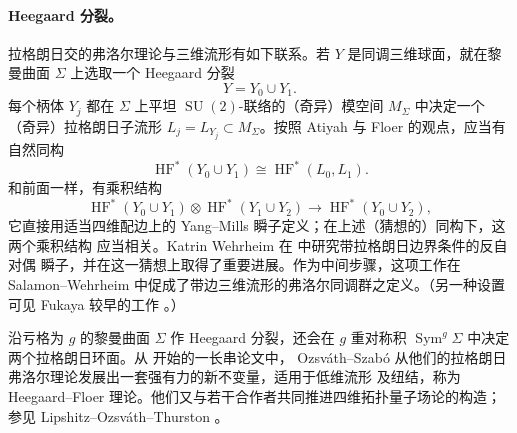 \begin{remark}
\paragraph{Heegaard 分裂。}
拉格朗日交的弗洛尔理论与三维流形有如下联系。若 $Y$ 是同调三维球面，就在黎曼曲面
$\Sigma$ 上选取一个 Heegaard 分裂
\[
  Y=Y_0\cup Y_1.
\]
每个柄体 $Y_j$ 都在 $\Sigma$ 上平坦 $\operatorname{SU}(2)$-联络的（奇异）模空间
$M_\Sigma$ 中决定一个（奇异）拉格朗日子流形
$L_j=L_{Y_j}\subset M_\Sigma$。按照 Atiyah  与 Floer 的观点，应当有自然同构
\[
  \operatorname{HF}^*(Y_0\cup Y_1)
  \cong\operatorname{HF}^*(L_0,L_1).
\]
和前面一样，有乘积结构
\[
  \operatorname{HF}^*(Y_0\cup Y_1)
  \otimes\operatorname{HF}^*(Y_1\cup Y_2)
  \longrightarrow\operatorname{HF}^*(Y_0\cup Y_2),
\]
它直接用适当四维配边上的 Yang--Mills 瞬子定义；在上述（猜想的）同构下，这两个乘积结构
应当相关。Katrin Wehrheim 在  中研究带拉格朗日边界条件的反自对偶
瞬子，并在这一猜想上取得了重要进展。作为中间步骤，这项工作在 Salamon--Wehrheim
 中促成了带边三维流形的弗洛尔同调群之定义。（另一种设置可见 Fukaya
较早的工作 。）

沿亏格为 $g$ 的黎曼曲面 $\Sigma$ 作 Heegaard 分裂，还会在 $g$ 重对称积
$\operatorname{Sym}^g\Sigma$ 中决定两个拉格朗日环面。从  开始的一长串论文中，
Ozsváth--Szabó 从他们的拉格朗日弗洛尔理论发展出一套强有力的新不变量，适用于低维流形
及纽结，称为 Heegaard--Floer 理论。他们又与若干合作者共同推进四维拓扑量子场论的构造；
参见 Lipshitz--Ozsváth--Thurston 。
\end{remark}
